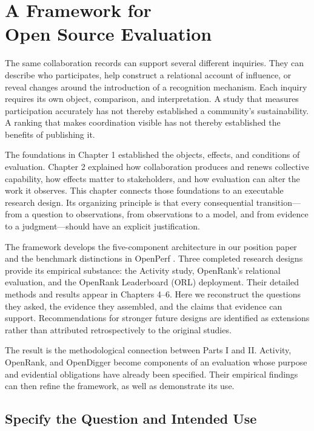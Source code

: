 \chapter[A Framework for Open Source Evaluation]{A Framework for\\Open Source Evaluation}
\label{ch:three}

The same collaboration records can support several different inquiries. They can describe who participates, help construct a relational account of influence, or reveal changes around the introduction of a recognition mechanism. Each inquiry requires its own object, comparison, and interpretation. A study that measures participation accurately has not thereby established a community's sustainability. A ranking that makes coordination visible has not thereby established the benefits of publishing it.

The foundations in Chapter 1 established the objects, effects, and conditions of evaluation. Chapter 2 explained how collaboration produces and renews collective capability, how effects matter to stakeholders, and how evaluation can alter the work it observes. This chapter connects those foundations to an executable research design. Its organizing principle is that every consequential transition---from a question to observations, from observations to a model, and from evidence to a judgment---should have an explicit justification.

The framework develops the five-component architecture in our position paper and the benchmark distinctions in OpenPerf \citep{han2024ose,han2025openperf}. Three completed research designs provide its empirical substance: the Activity study, OpenRank's relational evaluation, and the OpenRank Leaderboard (ORL) deployment. Their detailed methods and results appear in Chapters 4--6. Here we reconstruct the questions they asked, the evidence they assembled, and the claims that evidence can support. Recommendations for stronger future designs are identified as extensions rather than attributed retrospectively to the original studies.

The result is the methodological connection between Parts I and II. Activity, OpenRank, and OpenDigger become components of an evaluation whose purpose and evidential obligations have already been specified. Their empirical findings can then refine the framework, as well as demonstrate its use.

\section{Specify the Question and Intended Use}
\label{sec:ch3-question}

